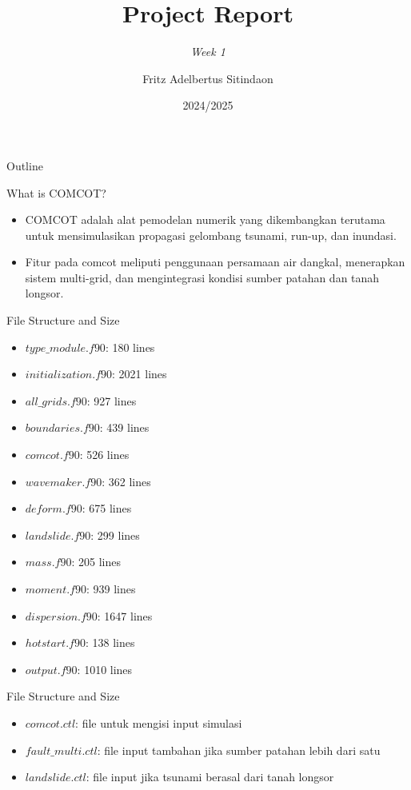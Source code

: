 \documentclass{beamer}
\title{Project Report}
\subtitle{\textit{Week 1}}
\date[]{2024/2025}
\author[Fritz]{Fritz Adelbertus Sitindaon}
\begin{document}
\begin{frame}
\titlepage
\end{frame}

\begin{frame}{Outline}
    \tableofcontents
\end{frame}


% 
\begin{frame}{What is COMCOT?}
    \begin{itemize}
        \item COMCOT adalah alat pemodelan 
        numerik yang dikembangkan terutama 
        untuk mensimulasikan propagasi gelombang 
        tsunami, run-up, dan inundasi. 
        \item Fitur pada comcot meliputi penggunaan 
        persamaan air dangkal, menerapkan sistem multi-grid,
        dan mengintegrasi kondisi sumber patahan dan tanah longsor.
    \end{itemize}
\end{frame}

\begin{frame}{File Structure and Size}
    \begin{itemize}
        \item $type\_module.f90$: 180 lines
        \item $initialization.f90$: 2021 lines
        \item $all\_grids.f90$: 927 lines
        \item $boundaries.f90$: 439 lines
        \item $comcot.f90$: 526 lines
        \item $wavemaker.f90$: 362 lines
        \item $deform.f90$: 675 lines
        \item $landslide.f90$: 299 lines
        \item $mass.f90$: 205 lines
        \item $moment.f90$: 939 lines
        \item $dispersion.f90$: 1647 lines
        \item $hotstart.f90$: 138 lines
        \item $output.f90$: 1010 lines
    \end{itemize}
\end{frame}

\begin{frame}{File Structure and Size}
    \begin{itemize}
        \item $comcot.ctl$: file untuk mengisi input simulasi
        \item $fault\_multi.ctl$: file input tambahan jika sumber patahan lebih dari satu
        \item $landslide.ctl$: file input jika tsunami berasal dari tanah longsor
    \end{itemize}
\end{frame}
\end{document}
